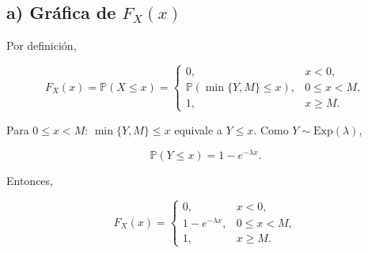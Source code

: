 \documentclass[10pt,a4paper]{article}
\begin{document}
    \begin{center}
    \end{center}
    { \hspace*{\fill} \\}
    
    \hypertarget{a-gruxe1fica-de-f_xx}{%
\subsection{\texorpdfstring{a) Gráfica de
\(F_X(x)\)}{a) Gráfica de F\_X(x)}}\label{a-gruxe1fica-de-f_xx}}

    Por definición,

\[
F_X(x)=\mathbb P(X\le x)=
\begin{cases}
0,&x<0,\\[2pt]
\mathbb P(\min\{Y,M\}\le x),&0\le x<M,\\[2pt]
1,&x\ge M.
\end{cases}
\]

Para \(0\le x<M\): \(\min\{Y,M\}\le x\) equivale a \(Y\le x\). Como
\(Y\sim\mathrm{Exp}(\lambda)\),

\[
\mathbb P(Y\le x)=1-e^{-\lambda x}.
\]

Entonces,

\[
F_X(x)=
\begin{cases}
0,&x<0,\\
1-e^{-\lambda x},&0\le x<M,\\
1,&x\ge M.
\end{cases}
\]
\end{document}
